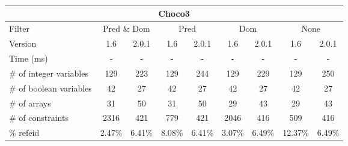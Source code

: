 \documentclass{standalone}
\begin{document}
\begin{tabular}{lc|c|c|c|c|c|c|c}
\multicolumn{9}{c}{Choco3} \\ 
\hline\hline Filter & \multicolumn{2}{c|}{Pred \& Dom} &\multicolumn{2}{c|}{Pred}  & \multicolumn{2}{c|}{Dom} & \multicolumn{2}{c}{None} \\ 
\hline Version & 1.6 & 2.0.1 & 1.6 & 2.0.1 & 1.6 & 2.0.1 & 1.6 & 2.0.1 \\ 
Time (ms)               & - & - & - & - & - & - & - & - \\ 
\# of integer variables & 129 & 223 & 129 & 244 & 129 & 229 & 129 & 250 \\ 
\# of boolean variables & 42 & 27 & 42 & 27 & 42 & 27 & 42 & 27 \\ 
\# of arrays            & 31 & 50 & 31 & 50 & 29 & 43 & 29 & 43 \\ 
\# of constraints       & 2316 & 421 & 779 & 421 & 2046 & 416 & 509 & 416 \\ 
\% refeid               & 2.47\% & 6.41\% & 8.08\% & 6.41\% & 3.07\% & 6.49\% & 12.37\% & 6.49\% \\ 
\end{tabular} 
\end{document}
